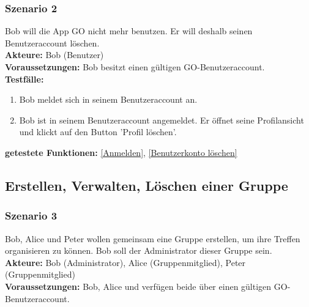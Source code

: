 \documentclass[parskip=full]{scrartcl}
\def\threedigits#1{%
  \ifnum#1<100 0\fi
  \ifnum#1<10 0\fi
  \number#1}
\begin{document}
\subsubsection*{Szenario 2}Bob will die App GO nicht mehr benutzen. Er will deshalb seinen Benutzeraccount löschen. \\

\textbf{Akteure:} Bob (Benutzer) \\

\textbf{Voraussetzungen: }Bob besitzt einen gültigen GO-Benutzeraccount.\\

\textbf{Testfälle:}
\begin{enumerate}[label={\textbf{/T\protect\threedigits{\theenumi}0/}}, leftmargin=*, resume]
	\item Bob meldet sich in seinem Benutzeraccount an. 
	\item Bob ist in seinem Benutzeraccount angemeldet. Er öffnet seine Profilansicht und klickt auf den Button 'Profil löschen'.
\end{enumerate}

\textbf{getestete Funktionen: }\ref{Anmelden}, \ref{Benutzerkonto löschen}

\subsection{Erstellen, Verwalten, Löschen einer Gruppe}

\subsubsection*{Szenario 3} Bob, Alice und Peter wollen gemeinsam eine Gruppe erstellen, um ihre Treffen organisieren zu können. Bob soll der Administrator dieser Gruppe sein.\\

\textbf{Akteure:} Bob (Administrator), Alice (Gruppenmitglied), Peter (Gruppenmitglied) \\

\textbf{Voraussetzungen: }Bob, Alice und verfügen beide über einen gültigen GO-Benutzeraccount.\\
\end{document}

